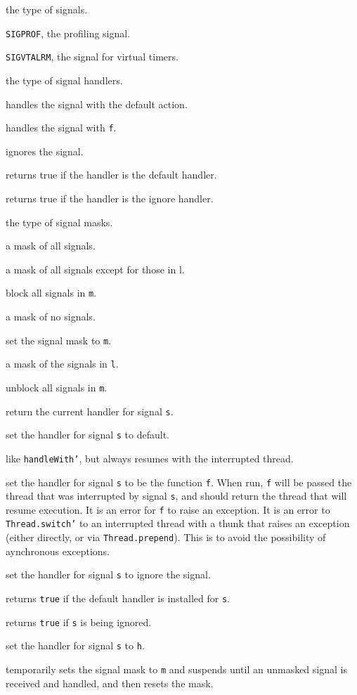 \begin{description}

 the type of signals.

{\tt SIGPROF}, the profiling signal.

{\tt SIGVTALRM}, the signal for virtual timers.

 the type of signal handlers.

 handles the signal with the default action.

 handles the signal with {\tt f}.

 ignores the signal.

 returns true if the handler is the default handler.

 returns true if the handler is the ignore handler.

 the type of signal masks.

 a mask of all signals.

 a mask of all signals except for those in l.

 block all signals in {\tt m}.

 a mask of no signals.

 set the signal mask to {\tt m}.

 a mask of the signals in {\tt l}.

 unblock all signals in {\tt m}.

 return the current handler for signal {\tt s}.

 set the handler for signal {\tt s} to default.

 like {\tt handleWith'}, but always resumes with the
interrupted thread.

set the handler for signal {\tt s} to be the function {\tt f}.  When
run, {\tt f} will be passed the thread that was interrupted by signal
{\tt s}, and should return the thread that will resume execution.  It
is an error for {\tt f} to raise an exception.  It is an error to {\tt
Thread.switch'} to an interrupted thread with a thunk that raises an
exception (either directly, or via {\tt Thread.prepend}).  This is to
avoid the possibility of aynchronous exceptions.

 set the handler for signal {\tt s} to ignore the signal.

 returns {\tt true} if the default handler
is installed for {\tt s}.

 returns {\tt true} if {\tt s} is being ignored.

 set the handler for signal {\tt s} to {\tt h}.

temporarily sets the signal mask to {\tt m} and suspends until an
unmasked signal is received and handled, and then resets the mask.
\end{description}
%

